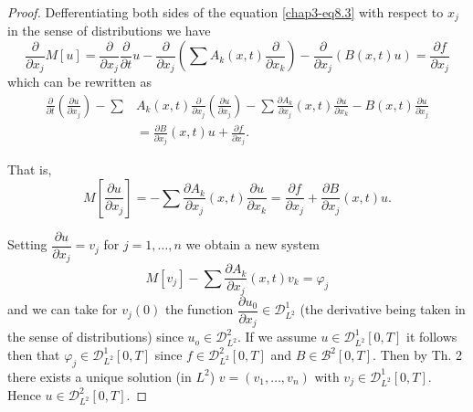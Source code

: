 \begin{proof}
Defferentiating both sides of the equation \eqref{chap3-eq8.3} with
respect to $x_j$ in the sense of distributions we have  
$$
\frac{\partial}{\partial x_j} M [ u ] = \frac{\partial}{\partial x_j}
\frac{\partial}{\partial  t} u - \frac{\partial}{\partial x_j} \left(
\sum A_k (x,t) \frac{\partial}{\partial x_k} \right)
-\frac{\partial}{\partial x_j} (B (x,t) u ) = \frac{\partial
  f}{\partial x_j} 
$$\pageoriginale
which can be rewritten as 
\begin{align*}
\frac{\partial}{\partial  t} \left(\frac{\partial u}{\partial x_j}\right) - \sum
& A_k (x,t) \frac{\partial}{\partial x_j} \left( \frac{\partial u}{\partial
  x_j} \right) - \sum \frac{\partial A_k}{\partial x_j} (x,t) 
\frac{\partial u}{\partial x_k} - B (x, t) \frac{\partial u}{\partial
  x_j} \\
& = \frac{\partial B}{\partial x_j} (x,t) u + \frac{\partial
  f}{\partial x_j}. 
\end{align*}

That is,
\begin{equation}
M \left[  \frac{\partial u}{\partial x_j} \right] = -\sum \frac{\partial
  A_k}{\partial x_j} (x, t) \frac{\partial u}{\partial x_k} =
\frac{\partial f}{\partial x_j} + \frac{\partial B}{\partial x_j}
(x,t) u. \tag{8.22}\label{chap3-eq8.22} 
\end{equation}

Setting $\dfrac{\partial u}{\partial x_j} = v_j$ for $j = 1,
\ldots, n$ we obtain a new system  
$$
M \left[ v_j \right] - \sum \frac{\partial A_k}{\partial x_j} (x, t) 
v_k  = \varphi_j 
$$
and we can take for $v_j (0)$ the function $\dfrac{\partial 
  u_0}{\partial x_j} \in \mathscr{D}^{1}_{L^2}$ (the
derivative being taken in the sense of distributions) since $u_o
\in \mathscr{D}^{2}_{L^2}$. 
If we assume $u \in \mathscr{D}^{1}_{L^2} \left[  0, T
  \right]$ it follows then that $\varphi_j \in
\mathscr{D}^{1}_{L^2} \left[  0, T \right]$ since  $f \in
\mathscr{D}^{2}_{L^2} \left[0, T \right]$ and  $B \in
\mathscr{B}^{2} \left[0, T \right]$. Then by Th. 2 there exists a
unique solution (in $L^2$) $v = ( v_1, \ldots , v_n )$ with  $v_j
\in \mathscr{D}^{1}_{L^2} \left[ 0, T \right]$. Hence $u
\in \mathscr{D}^{2}_{L^2} \left[ 0, T \right]$. 
\end{proof} 

